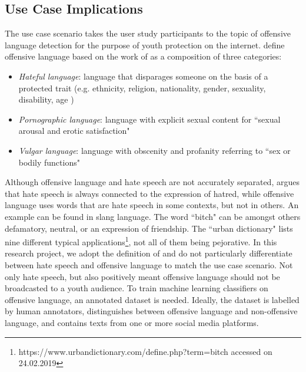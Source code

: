 \subsection{Use Case Implications}
The use case scenario takes the user study participants to the topic of offensive language detection for the purpose of youth protection on the internet. \cite{chen2012detecting} define offensive language based on the work of \cite{jay2008pragmatics} as a composition of three categories:
\begin{itemize}
	\item \textit{Hateful language}: language that disparages someone on the basis of a protected trait (e.g. ethnicity, religion, nationality, gender, sexuality, disability, age \cite{diakopoulos2016accountability})
	\item \textit{Pornographic language}: language with explicit sexual content for ``sexual arousal and erotic satisfaction" \cite{chen2012detecting}
	\item \textit{Vulgar language}: language with obscenity and profanity referring to ``sex or bodily functions" \cite{chen2012detecting}	
\end{itemize}
Although offensive language and hate speech are not accurately separated, \cite{davidson2017automated} argues that hate speech is always connected to the expression of hatred, while offensive language uses words that are hate speech in some contexts, but not in others. An example can be found in slang language. The word ``bitch" can be amongst others defamatory, neutral, or an expression of friendship. The ``urban dictionary" lists nine different typical applications\footnote{https://www.urbandictionary.com/define.php?term=bitch accessed on 24.02.2019}, not all of them being pejorative. In this research project, we adopt the definition of \cite{chen2012detecting} and do not particularly differentiate between hate speech and offensive language to match the use case scenario. Not only hate speech, but also positively meant offensive language should not be broadcasted to a youth audience.\newline
To train machine learning classifiers on offensive language, an annotated dataset is needed. Ideally, the dataset is labelled by human annotators, distinguishes between offensive language and non-offensive language, and contains texts from one or more social media platforms.

